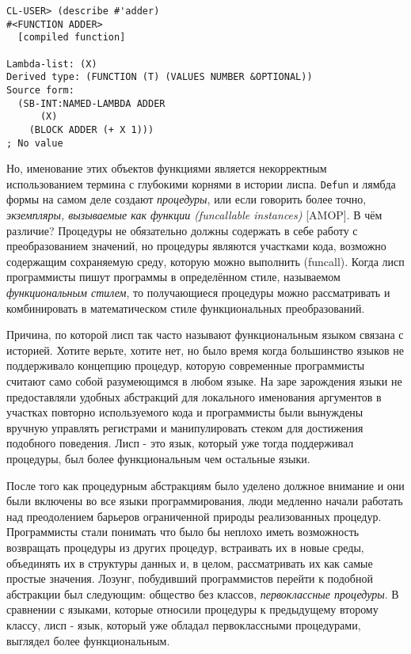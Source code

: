 \begin{verbatim} 
CL-USER> (describe #'adder)
#<FUNCTION ADDER>
  [compiled function]

Lambda-list: (X)
Derived type: (FUNCTION (T) (VALUES NUMBER &OPTIONAL))
Source form:
  (SB-INT:NAMED-LAMBDA ADDER
      (X)
    (BLOCK ADDER (+ X 1)))
; No value
\end{verbatim}
 
Но, именование этих объектов функциями является некорректным использованием термина с глубокими корнями в истории лиспа. \verb"Defun" и лямбда формы на самом деле создают \emph{процедуры}, или если говорить более точно, \emph{экземпляры, вызываемые как функции (funcallable instances)} [AMOP]. В чём различие? Процедуры не обязательно должны содержать в себе работу с преобразованием значений, но процедуры являются участками кода, возможно содержащим сохраняемую среду, которую можно выполнить (funcall). Когда лисп программисты пишут программы в определённом стиле, называемом \emph{функциональным стилем}, то получающиеся процедуры можно рассматривать и комбинировать в математическом стиле функциональных преобразований. 
 
Причина, по которой лисп так часто называют функциональным языком связана с историей. Хотите верьте, хотите нет, но было время когда большинство языков не поддерживало концепцию процедур, которую современные программисты считают само собой разумеющимся в любом языке. На заре зарождения языки не предоставляли удобных абстракций для локального именования аргументов в участках повторно используемого кода и программисты были вынуждены вручную управлять регистрами и манипулировать стеком для достижения подобного поведения. Лисп - это язык, который уже тогда поддерживал процедуры, был более функциональным чем остальные языки. 
 
После того как процедурным абстракциям было уделено должное внимание и они были включены во все языки программирования, люди медленно начали работать над преодолением барьеров ограниченной природы реализованных процедур. Программисты стали понимать что было бы неплохо иметь возможность возвращать процедуры из других процедур, встраивать их в новые среды, объединять их в структуры данных и, в целом, рассматривать их как самые простые значения. Лозунг, побудивший программистов перейти к подобной абстракции был следующим: общество без классов, \emph{первоклассные процедуры}. В сравнении с языками, которые относили процедуры к предыдущему второму классу, лисп - язык, который уже обладал первоклассными процедурами, выглядел более функциональным. 
 
